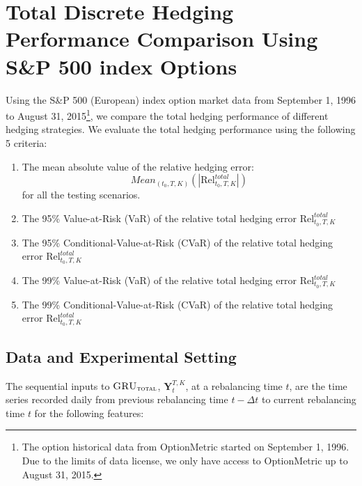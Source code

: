\documentclass[letterpaper,12pt,titlepage,oneside,final]{book}
\numberwithin{equation}{section}
\theoremstyle{definition}
\newcommand{\modelT}{\textsc{GRU}_{\textsc{total}}}
\newcommand{\DT}{\Delta t}
\begin{document}
\section{Total Discrete Hedging Performance Comparison Using  S\&P 500 index Options} \label{sec:totalcriteria}
Using the S\&P 500  ({European})  index option market data from September 1, 1996 to August 31, 2015\footnote{The option historical data from OptionMetric \cite{optionmetrics2008ivy} started on September 1, 1996. Due to the limits of data license, we only have access to OptionMetric up to  August 31, 2015.},
we  compare the total hedging performance of different hedging strategies.
We evaluate the total hedging performance using the following 5 criteria:
\begin{enumerate}
	\item The mean absolute value of the relative hedging error:
	\[
	Mean_{(t_0,T,K)}\left(\left|\text{Rel}^{total}_{t_0,T,K}\right|\right)
	\] for all the testing scenarios.
	\item The 95\% Value-at-Risk (VaR) of the relative total hedging error $\text{Rel}^{total}_{t_0,T,K}$
	\item The 95\% Conditional-Value-at-Risk (CVaR) of the relative total hedging error $\text{Rel}^{total}_{t_0,T,K}$
	\item The 99\% Value-at-Risk (VaR) of the relative total hedging error $\text{Rel}^{total}_{t_0,T,K}$
	\item The 99\% Conditional-Value-at-Risk (CVaR) of the relative total hedging error $\text{Rel}^{total}_{t_0,T,K}$
\end{enumerate}


\subsection{Data and Experimental Setting}
The sequential inputs to $\modelT$, $\mathbf{Y}_{t}^{T,K}$, at a rebalancing time $t$, are the  time series recorded daily from previous rebalancing time $t-\DT$ to current rebalancing time $t$ for the following features:
\end{document}
